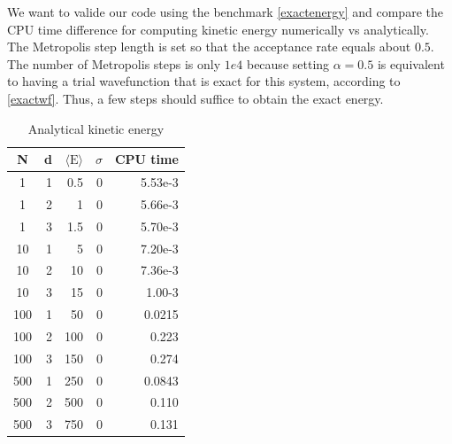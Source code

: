 \documentclass[english, a4paper]{article}
\begin{document}
We want to valide our code using the benchmark \eqref{exactenergy} and
compare the CPU time difference for computing kinetic energy numerically vs analytically. 
The Metropolis step length is set so that the acceptance rate equals about $0.5$.
The number of Metropolis steps is only $1e4$ because setting $\alpha = 0.5$ is equivalent to
having a trial wavefunction that is exact for this system, according to \eqref{exactwf}. Thus, a few steps should suffice
to obtain the exact energy.

\begin{table}[H]
    \begin{minipage}{.5\linewidth}
      \centering
   \begin{tabular}{ | c | r | r | r | r |}
    \hline
    N& d& $\langle \textrm{E}\rangle$& $\sigma$& CPU time \\*
    \hline
    1& 1& 0.5& 0& 5.53e-3 \\*
    \hline
    1& 2& 1& 0&  5.66e-3\\*
    \hline
    1& 3& 1.5& 0&  5.70e-3\\*
    \hline
    10& 1& 5& 0&  7.20e-3\\*
    \hline
    10& 2& 10& 0&  7.36e-3\\*
    \hline
    10& 3& 15& 0&  1.00-3\\*
    \hline
    100& 1& 50& 0&  0.0215\\*
    \hline
    100& 2& 100& 0&  0.223\\*
    \hline
    100& 3& 150& 0&  0.274\\*
    \hline
    500& 1& 250& 0&  0.0843\\*
    \hline
    500& 2& 500& 0&  0.110\\*
    \hline
    500& 3& 750& 0&  0.131\\*
    \hline
  \end{tabular}
        \caption{Analytical kinetic energy}
    \end{minipage}
    \begin{minipage}{.5\linewidth}
      \centering
       

\end{minipage}
\end{table}
\end{document}
